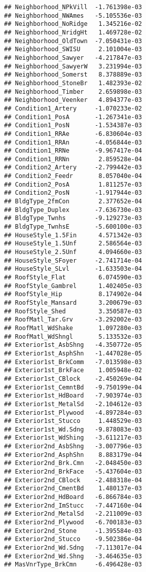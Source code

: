 \documentclass[
]{article}
\begin{document}
\begin{verbatim}
## Neighborhood_NPkVill  -1.761398e-03
## Neighborhood_NWAmes   -5.105536e-03
## Neighborhood_NoRidge   1.345216e-02
## Neighborhood_NridgHt   1.469728e-02
## Neighborhood_OldTown  -7.050431e-03
## Neighborhood_SWISU     2.101004e-03
## Neighborhood_Sawyer   -4.217847e-03
## Neighborhood_SawyerW   3.231994e-03
## Neighborhood_Somerst   8.378889e-03
## Neighborhood_StoneBr   1.482393e-02
## Neighborhood_Timber    2.659898e-03
## Neighborhood_Veenker   4.894377e-03
## Condition1_Artery     -1.070233e-02
## Condition1_PosA       -1.267341e-03
## Condition1_PosN       -1.534387e-03
## Condition1_RRAe       -6.830604e-03
## Condition1_RRAn       -4.056844e-03
## Condition1_RRNe       -9.967417e-04
## Condition1_RRNn        2.859528e-04
## Condition2_Artery     -2.799442e-03
## Condition2_Feedr       8.057040e-04
## Condition2_PosA        1.811257e-03
## Condition2_PosN       -1.917944e-03
## BldgType_2fmCon        2.377652e-04
## BldgType_Duplex       -7.636730e-03
## BldgType_Twnhs        -9.129273e-03
## BldgType_TwnhsE       -5.600100e-03
## HouseStyle_1.5Fin      4.571342e-03
## HouseStyle_1.5Unf      2.586564e-03
## HouseStyle_2.5Unf      4.094660e-03
## HouseStyle_SFoyer     -2.741714e-04
## HouseStyle_SLvl       -1.633503e-04
## RoofStyle_Flat         6.074590e-03
## RoofStyle_Gambrel      1.402405e-03
## RoofStyle_Hip          8.174902e-04
## RoofStyle_Mansard      3.200679e-03
## RoofStyle_Shed         3.350587e-03
## RoofMatl_Tar.Grv      -3.292002e-03
## RoofMatl_WdShake       1.097280e-03
## RoofMatl_WdShngl       5.133532e-03
## Exterior1st_AsbShng   -4.350772e-05
## Exterior1st_AsphShn   -1.447028e-05
## Exterior1st_BrkComm   -7.013598e-03
## Exterior1st_BrkFace    1.005948e-02
## Exterior1st_CBlock    -2.450269e-04
## Exterior1st_CemntBd   -9.750199e-04
## Exterior1st_HdBoard   -7.903974e-03
## Exterior1st_MetalSd   -2.104612e-03
## Exterior1st_Plywood   -4.897284e-03
## Exterior1st_Stucco     1.448529e-03
## Exterior1st_Wd.Sdng   -9.878083e-03
## Exterior1st_WdShing   -3.611217e-03
## Exterior2nd_AsbShng   -3.007796e-03
## Exterior2nd_AsphShn    8.883179e-04
## Exterior2nd_Brk.Cmn   -2.048450e-03
## Exterior2nd_BrkFace   -5.437604e-03
## Exterior2nd_CBlock    -2.488318e-04
## Exterior2nd_CmentBd    1.480137e-03
## Exterior2nd_HdBoard   -6.866784e-03
## Exterior2nd_ImStucc   -7.447160e-04
## Exterior2nd_MetalSd   -2.211009e-03
## Exterior2nd_Plywood   -6.700183e-03
## Exterior2nd_Stone     -1.395584e-03
## Exterior2nd_Stucco    -9.502386e-04
## Exterior2nd_Wd.Sdng   -7.113017e-04
## Exterior2nd_Wd.Shng   -3.464635e-03
## MasVnrType_BrkCmn     -6.496428e-03

\end{verbatim}
\end{document}
